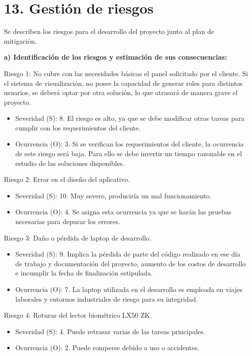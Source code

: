 \documentclass[
11pt, %
]{charter}
\begin{document}
\section{13. Gestión de riesgos}
\label{sec:riesgos}

Se describen los riesgos para el desarrollo del proyecto junto al plan de mitigación.

\textbf{a) Identificación de los riesgos y estimación de sus consecuencias:}

Riesgo 1: No cubre con las necesidades básicas el panel solicitado por el cliente. Si el sistema de visualización, no posee la capacidad de generar roles para distintos usuarios, se deberá optar por otra solución, lo que atrasará de manera grave el proyecto.
\begin{itemize}
\item Severidad (S): 8. El riesgo es alto, ya que se debe modificar otras tareas para cumplir con los requerimientos del cliente.
\item Ocurrencia (O): 3. Si se verifican los requerimientos del cliente, la ocurrencia de este riesgo será baja. Para ello se debe invertir un tiempo razonable en el estudio de las soluciones disponibles.
\end{itemize}

Riesgo 2: Error en el diseño del aplicativo.
\begin{itemize}
\item Severidad (S): 10. Muy severo, produciría un mal funcionamiento.
\item Ocurrencia (O): 4. Se asigna esta ocurrencia ya que se harán las pruebas necesarias para depurar los errores.
\end{itemize}

Riesgo 3: Daño o pérdida de laptop de desarrollo.
\begin{itemize}
\item Severidad (S): 9. Implica la pérdida de parte del código realizado en ese día de trabajo y documentación del proyecto, aumento de los costos de desarrollo e incumplir la fecha de finalización estipulada.
\item Ocurrencia (O): 7. La laptop utilizada en el desarrollo es empleada en viajes
laborales y entornos industriales de riesgo para su integridad.
\end{itemize}

Riesgo 4: Roturas del lector biométrico LX50 ZK.
\begin{itemize}
\item Severidad (S): 4. Puede retrasar varias de las tareas principales.
\item Ocurrencia (O): 2. Puede romperse debido a uso o accidentes.
\end{itemize}
\end{document}
